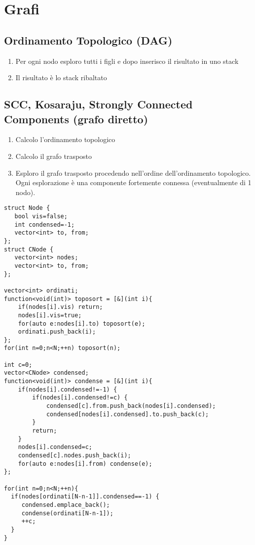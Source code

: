 \documentclass{article}
\begin{document}
\section{Grafi}

\subsection{Ordinamento Topologico (DAG)}
\begin{enumerate}
    \item Per ogni nodo esploro tutti i figli e dopo inserisco il risultato in uno stack
    \item Il risultato è lo stack ribaltato
\end{enumerate}

\subsection{SCC, Kosaraju, Strongly Connected Components (grafo diretto)}
\begin{enumerate}
    \item Calcolo l’ordinamento topologico
    \item Calcolo il grafo trasposto
    \item Esploro il grafo trasposto procedendo nell’ordine dell’ordinamento topologico. Ogni esplorazione è una componente fortemente connessa (eventualmente di 1 nodo).
\end{enumerate}
\begin{lstlisting}
struct Node {
   bool vis=false;
   int condensed=-1;
   vector<int> to, from;
};
struct CNode {
   vector<int> nodes;
   vector<int> to, from;
};

vector<int> ordinati;
function<void(int)> toposort = [&](int i){
    if(nodes[i].vis) return;
    nodes[i].vis=true;
    for(auto e:nodes[i].to) toposort(e);
    ordinati.push_back(i);
};
for(int n=0;n<N;++n) toposort(n);

int c=0;
vector<CNode> condensed;
function<void(int)> condense = [&](int i){
    if(nodes[i].condensed!=-1) {
        if(nodes[i].condensed!=c) {
            condensed[c].from.push_back(nodes[i].condensed);
            condensed[nodes[i].condensed].to.push_back(c);
        }
        return;
    }
    nodes[i].condensed=c;
    condensed[c].nodes.push_back(i);
    for(auto e:nodes[i].from) condense(e);
};

for(int n=0;n<N;++n){
  if(nodes[ordinati[N-n-1]].condensed==-1) {
     condensed.emplace_back();
     condense(ordinati[N-n-1]);
     ++c;
  }
}
\end{lstlisting}
\end{document}
